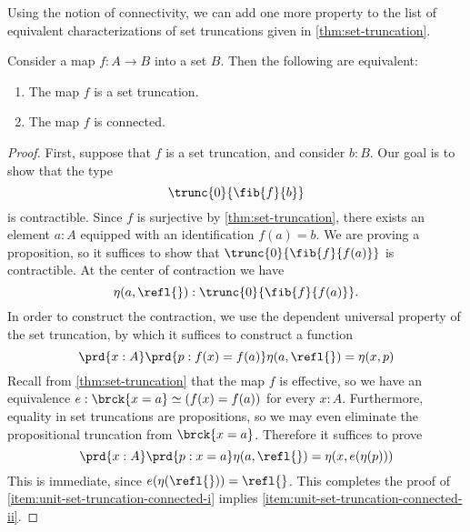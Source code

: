 Using the notion of connectivity, we can add one more property to the list of equivalent characterizations of set truncations given in \cref{thm:set-truncation}.

\begin{thm}\label{thm:unit-set-truncation-connected}
  Consider a map $f:A\to B$ into a set $B$. Then the following are equivalent:
  \begin{enumerate}
  \item \label{item:unit-set-truncation-connected-i}The map $f$ is a set truncation.
  \item \label{item:unit-set-truncation-connected-ii}The map $f$ is connected.
  \end{enumerate}
\end{thm}

\begin{proof}
  First, suppose that $f$ is a set truncation, and consider $b:B$. Our goal is to show that the type
  \begin{equation*}
    \trunc{0}{\fib{f}{b}}
  \end{equation*}
  is contractible. Since $f$ is surjective by \cref{thm:set-truncation}, there exists an element $a:A$ equipped with an identification $f(a)=b$. We are proving a proposition, so it suffices to show that $\trunc{0}{\fib{f}{f(a)}}$ is contractible. At the center of contraction we have
  \begin{equation*}
    \eta(a,\refl{}):\trunc{0}{\fib{f}{f(a)}}.
  \end{equation*}
  In order to construct the contraction, we use the dependent universal property of the set truncation, by which it suffices to construct a function
  \begin{equation*}
    \prd{x:A}\prd{p:f(x)=f(a)}\eta(a,\refl{})=\eta(x,p)
  \end{equation*}
  Recall from \cref{thm:set-truncation} that the map $f$ is effective, so we have an equivalence $e:\brck{x=a}\simeq (f(x)=f(a))$ for every $x:A$. Furthermore, equality in set truncations are propositions, so we may even eliminate the propositional truncation from $\brck{x=a}$. Therefore it suffices to prove
  \begin{equation*}
    \prd{x:A}\prd{p:x=a}\eta(a,\refl{})=\eta(x,e(\eta(p)))
  \end{equation*}
  This is immediate, since $e(\eta(\refl{}))=\refl{}$. This completes the proof of \ref{item:unit-set-truncation-connected-i} implies \ref{item:unit-set-truncation-connected-ii}.


\end{proof}
